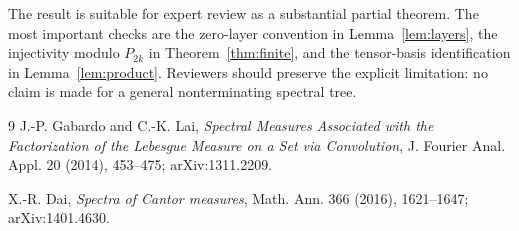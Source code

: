 \documentclass[11pt]{article}
\begin{document}
The result is suitable for expert review as a substantial partial theorem.
The most important checks are the zero-layer convention in
Lemma~\ref{lem:layers}, the injectivity modulo $P_{2k}$ in
Theorem~\ref{thm:finite}, and the tensor-basis identification in
Lemma~\ref{lem:product}.  Reviewers should preserve the explicit limitation:
no claim is made for a general nonterminating spectral tree.

\begin{thebibliography}{9}
J.-P. Gabardo and C.-K. Lai,
\emph{Spectral Measures Associated with the Factorization of the Lebesgue
Measure on a Set via Convolution}, J. Fourier Anal. Appl. 20 (2014), 453--475;
arXiv:1311.2209.

X.-R. Dai,
\emph{Spectra of Cantor measures}, Math. Ann. 366 (2016), 1621--1647;
arXiv:1401.4630.
\end{thebibliography}
\end{document}

